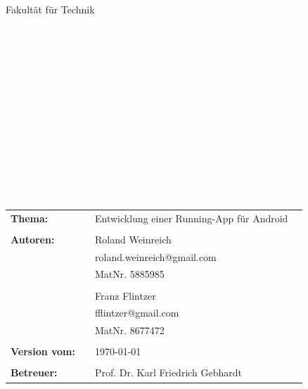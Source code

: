 \begin{center}
\Large{Fakultät für Technik}
\end{center}
\begin{verbatim}




\end{verbatim}
\begin{center}
\doublespacing
\textbf{\LARGE{\titleDocument}}\\
\singlespacing
\begin{verbatim}

\end{verbatim}
\textbf{{\subjectDocument}}
\end{center}
\begin{verbatim}

\end{verbatim}
\begin{center}

\end{center}
\begin{verbatim}

\end{verbatim}
\begin{verbatim}






\end{verbatim}
\begin{flushleft}
\begin{tabular}{llll}
\textbf{Thema:} & & Entwicklung einer Running-App für Android & \\
& & \\
\textbf{Autoren:} & & Roland Weinreich& \\
& & roland.weinreich@gmail.com & \\
& & MatNr. 5885985 & \\
& & \\
& & Franz Flintzer& \\
& & fflintzer@gmail.com & \\
& & MatNr. 8677472 & \\
& & \\
\textbf{Version vom:} & & \today &\\
& & \\
\textbf{Betreuer:} & & Prof. Dr. Karl Friedrich Gebhardt &\\
\end{tabular}
\end{flushleft}